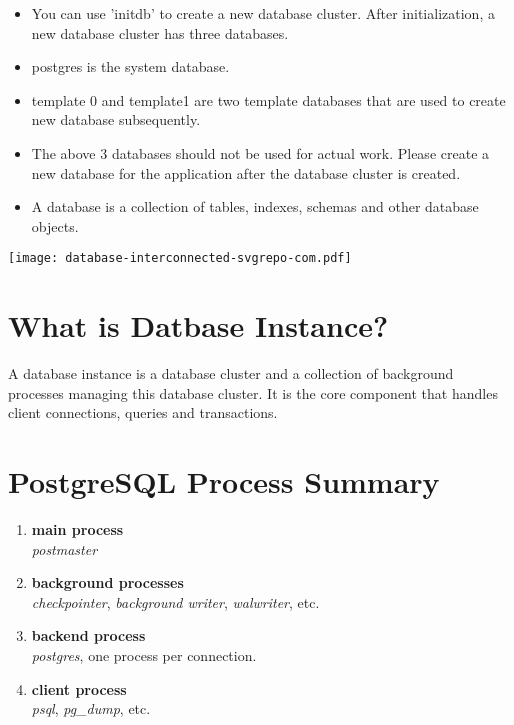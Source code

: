 \documentclass[en,hazy,blue,screen,14pt]{elegantnote}
\begin{document}
\begin{itemize}
  \item You can use 'initdb' to create a new database cluster. After initialization, a new database cluster has three databases.
  \item postgres is the system database.
  \item template 0 and template1 are two template databases that are used to create new database subsequently.
  \item The above 3 databases should not be used for actual work. Please create a new database for the application after the database cluster is created.
  \item A database is a collection of tables, indexes, schemas and other database objects.
\end{itemize}

\centerline{\texttt{[image: database-interconnected-svgrepo-com.pdf]}}

\newpage
\section{What is Datbase Instance?}

A database instance is a database cluster and a collection of background processes managing this database cluster. It is the core component that handles client connections, queries and transactions.

\newpage
\section{PostgreSQL Process Summary}
\begin{enumerate}[label=\arabic*).]
	\item \textbf{main process}\\
    		\textit{postmaster}
	\item \textbf{background processes}\\
		\textit{checkpointer}, \textit{background writer}, \textit{walwriter}, etc.
	\item \textbf{backend process}\\
	  \textit{postgres}, one process per connection.
	\item \textbf{client process}\\
	  \textit{psql}, \textit{pg\_dump}, etc.
\end{enumerate}
\end{document}

